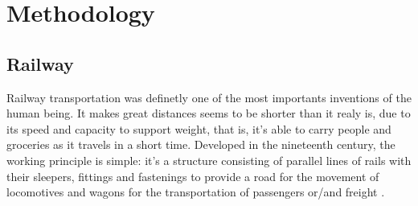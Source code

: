 \chapter{Methodology}\label{cha:methodology}
\section{Railway}\label{sec:railway}

Railway transportation was definetly one of the most importants inventions of the human being. It makes great distances seems to be shorter than it realy is, due to its speed and capacity to support weight, that is, it's able to carry people and groceries as it travels in a short time. Developed in the nineteenth century, the working principle is simple: it's a structure consisting of parallel lines of rails with their sleepers, fittings and fastenings to provide a road for the movement of locomotives and wagons for the transportation of passengers or/and freight \citep{mundrey_railway_2010}.
